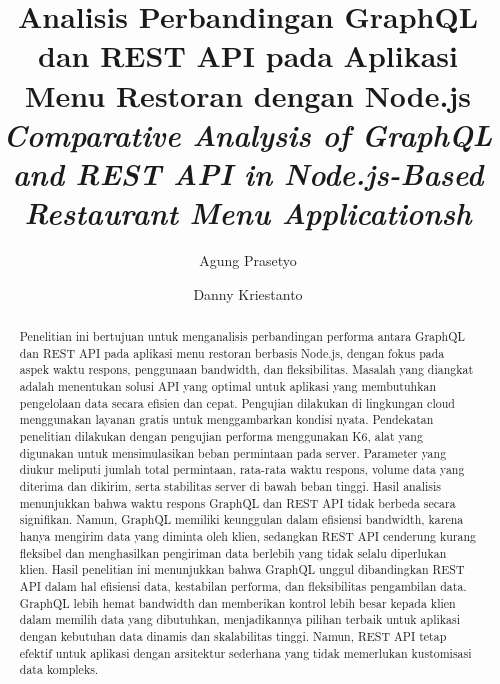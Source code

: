 \documentclass[
 manuscript=article,  %
  layout=publish, 
  year=2024, 
  month= Februari, %
  volume=8,
  number=1 
]{JIKO}
\title{%
	Analisis Perbandingan GraphQL dan REST API pada Aplikasi Menu Restoran dengan Node.js\\
	\itshape Comparative Analysis of GraphQL and REST API in Node.js-Based Restaurant Menu Applicationsh\\
}
\author{Agung Prasetyo}
\affiliation{Teknik Komputer, Fakultas Teknologi Informasi, Universitas Teknologi Digital Indonesia, Yogyakarta, Indonesia}
\author{Danny Kriestanto}
\affiliation{Departmen, Fakultas, Kampus-2, Kota, Negara}
\begin{document}

 
\begin{abstract}
Penelitian ini bertujuan untuk menganalisis perbandingan performa antara GraphQL dan REST API pada aplikasi menu restoran berbasis Node.js, dengan fokus pada aspek waktu respons, penggunaan bandwidth, dan fleksibilitas. Masalah yang diangkat adalah menentukan solusi API yang optimal untuk aplikasi yang membutuhkan pengelolaan data secara efisien dan cepat. Pengujian dilakukan di lingkungan cloud menggunakan layanan gratis untuk menggambarkan kondisi nyata. Pendekatan penelitian dilakukan dengan pengujian performa menggunakan K6, alat yang digunakan untuk mensimulasikan beban permintaan pada server. Parameter yang diukur meliputi jumlah total permintaan, rata-rata waktu respons, volume data yang diterima dan dikirim, serta stabilitas server di bawah beban tinggi. Hasil analisis menunjukkan bahwa waktu respons GraphQL dan REST API tidak berbeda secara signifikan. Namun, GraphQL memiliki keunggulan dalam efisiensi bandwidth, karena hanya mengirim data yang diminta oleh klien, sedangkan REST API cenderung kurang fleksibel dan menghasilkan pengiriman data berlebih yang tidak selalu diperlukan klien. Hasil penelitian ini menunjukkan bahwa GraphQL unggul dibandingkan REST API dalam hal efisiensi data, kestabilan performa, dan fleksibilitas pengambilan data. GraphQL lebih hemat bandwidth dan memberikan kontrol lebih besar kepada klien dalam memilih data yang dibutuhkan, menjadikannya pilihan terbaik untuk aplikasi dengan kebutuhan data dinamis dan skalabilitas tinggi. Namun, REST API tetap efektif untuk aplikasi dengan arsitektur sederhana yang tidak memerlukan kustomisasi data kompleks.
\end{abstract}
\end{document}
